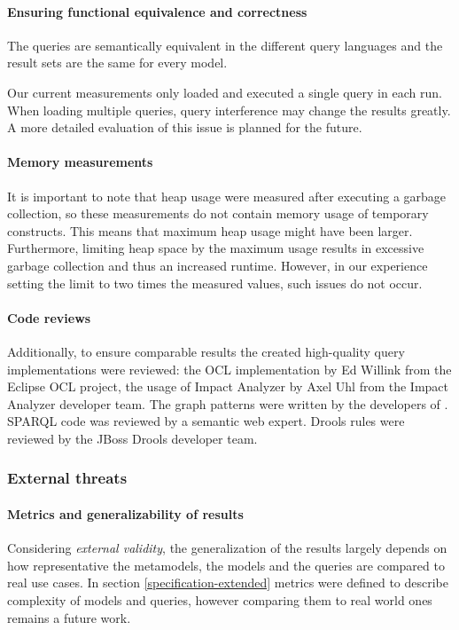 \paragraph{Ensuring functional equivalence and correctness}
The queries are semantically equivalent in the different query languages and the
result sets are the same for every model. 

Our current measurements only loaded and executed a single query in each run.
When loading multiple queries, query interference may change the results
greatly. A more detailed evaluation of this issue is planned for the future.


\paragraph{Memory measurements}
It is important to note that heap usage were measured after executing a garbage
collection, so these measurements do not contain memory usage of temporary
constructs. This means that maximum heap usage might have been larger. Furthermore,
limiting heap space by the maximum usage results in excessive garbage collection
and thus an increased runtime. However, in our experience setting the limit to
two times the measured values, such issues do not occur.



\paragraph{Code reviews}
Additionally, to ensure comparable
results the created high-quality query implementations were reviewed: the OCL
implementation by Ed Willink from the Eclipse OCL project, the usage of Impact
Analyzer by Axel Uhl from the Impact Analyzer developer team. The graph patterns
were written by the developers of \eiq{}. SPARQL code was reviewed by a semantic web expert. Drools rules were reviewed by the JBoss Drools developer team. 

\subsubsection{External threats}

\paragraph{Metrics and generalizability of results}
Considering \emph{external validity}, the generalization of the results largely
depends on how representative the metamodels, the models and the queries are
compared to real use cases. In section \ref{specification-extended} metrics were
defined to describe complexity of models and queries, however comparing them to
real world ones remains a future work.

